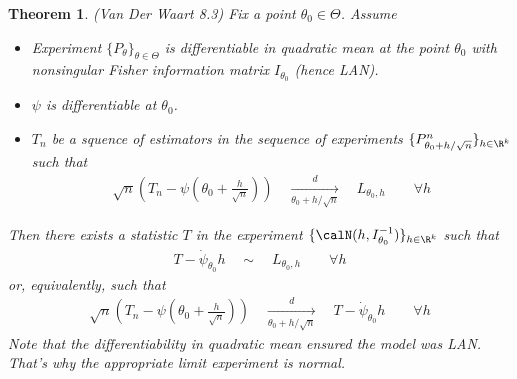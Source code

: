 \documentclass[12pt]{article}
\theoremstyle{plain}
\newtheorem{thm}{Theorem}[section]
\theoremstyle{definition}
\theoremstyle{remark}
\newcommand{\dto}{\xrightarrow{d}}
\begin{document}
\begin{thm}
\label{vdw8.3}
\emph{(Van Der Waart 8.3)}
Fix a point $\theta_0\in\Theta$.
Assume
\begin{itemize}
  \item Experiment $\{P_{\theta}\}_{\theta\in\Theta}$ is
    differentiable in quadratic mean at the point $\theta_0$ with
    nonsingular Fisher information matrix $I_{\theta_0}$ (hence LAN).

  \item $\psi$ is differentiable at $\theta_0$.
  \item $T_n$ be a squence of estimators in the sequence of experiments
    $\{P^n_{\theta_0+h/\sqrt{n}}\}_{h\in\R^k}$ such that
    \begin{align}
      \sqrt{n}
      \left(
      T_n
      -
      \psi\left(
      \theta_0 + \frac{h}{\sqrt{n}}
      \right)
      \right)
      \quad\underset{\theta_0+h/\sqrt{n}}{\dto}\quad
      L_{\theta_0,h}
      \qquad
      \forall h
      \label{convergence}
    \end{align}
\end{itemize}
Then there exists a statistic $T$ in the experiment
$\{\calN(h,I_{\theta_0}^{-1})\}_{h\in\R^k}$ such that
\begin{align}
  T - \dot{\psi}_{\theta_0} h
  \quad
  \sim
  \quad
  L_{\theta_0,h}
  \qquad
  \forall h
  \label{matched}
\end{align}
or, equivalently, such that
\begin{align}
  \sqrt{n}
  \left(
  T_n
  -
  \psi\left(
  \theta_0 + \frac{h}{\sqrt{n}}
  \right)
  \right)
  \quad\underset{\theta_0+h/\sqrt{n}}{\dto}\quad
  T - \dot{\psi}_{\theta_0} h
  \qquad
  \forall h
  \label{convergence2}
\end{align}
Note that the differentiability in quadratic mean ensured the model was
LAN. That's why the appropriate limit experiment is normal.
\end{thm}
\end{document}
